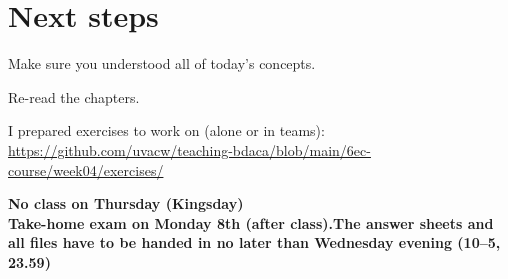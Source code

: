 
\section{Next steps}

\begin{frame}[standout]
Make sure you understood all of today's concepts.

Re-read the chapters.

I prepared exercises to work on (alone or in teams):
\large{\url{https://github.com/uvacw/teaching-bdaca/blob/main/6ec-course/week04/exercises/}}


\textbf{No class on Thursday (Kingsday)}
\\
\textbf{Take-home exam on Monday 8th (after class).The
answer sheets and all files have to be handed in no
later than Wednesday evening (10–5, 23.59)}

\end{frame}


\begin{frame}
	\printbibliography
\end{frame}




